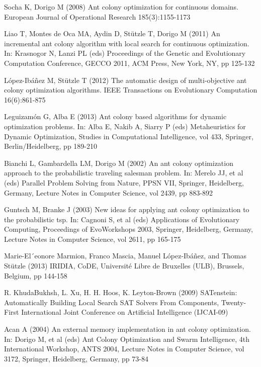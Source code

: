 \documentclass[12pt]{article}
\begin{document}
\begin{thebibliography}{1}
 Socha K, Dorigo M (2008) Ant colony optimization for continuous domains. European Journal of Operational Research 185(3):1155-1173
  
 Liao T, Montes de Oca MA, Aydin D, St{\"u}tzle T, Dorigo M (2011) An incremental ant colony algorithm with local search for continuous optimization. In: Krasnogor N, Lanzi PL (eds) Proceedings of the Genetic and Evolutionary Computation Conference, GECCO 2011, ACM Press, New York, NY, pp 125-132
  
 L{\'o}pez-Ib{\'a}{\~n}ez M, St{\"u}tzle T (2012) The automatic design of multi-objective ant colony optimization algorithms. IEEE Transactions on Evolutionary Computation 16(6):861-875

 Leguizam{\'o}n G, Alba E (2013) Ant colony based algorithms for dynamic optimization problems. In: Alba E, Nakib A, Siarry P (eds) Metaheuristics for Dynamic Optimization, Studies in Computational Intelligence, vol 433, Springer, Berlin/Heidelberg, pp 189-210
 
 Bianchi L, Gambardella LM, Dorigo M (2002) An ant colony optimization approach to the probabilistic traveling salesman problem. In: Merelo JJ, et al (eds) Parallel Problem Solving from Nature, PPSN VII, Springer, Heidelberg, Germany, Lecture Notes in Computer Science, vol 2439, pp 883-892

 Guntsch M, Branke J (2003) New ideas for applying ant colony optimization to the probabilistic tsp. In: Cagnoni S, et al (eds) Applications of Evolutionary Computing, Proceedings of EvoWorkshops 2003, Springer, Heidelberg, Germany, Lecture Notes in Computer Science, vol 2611, pp 165-175

 Marie-El´eonore Marmion, Franco Mascia, Manuel L{\'o}pez-Ib{\'a}{\~n}ez, and Thomas St{\"u}tzle (2013) IRIDIA, CoDE, Universit{\'e} Libre de Bruxelles (ULB), Brussels, Belgium, pp 144-158

 R. KhudaBukhsh, L. Xu, H. H. Hoos, K. Leyton-Brown (2009) SATenstein: Automatically Building Local Search SAT Solvers From Components, Twenty-First International Joint Conference on Artificial Intelligence (IJCAI-09)

 Acan A (2004) An external memory implementation in ant colony optimization. In: Dorigo M, et al (eds) Ant Colony Optimization and Swarm Intelligence, 4th International Workshop, ANTS 2004, Lecture Notes in Computer Science, vol 3172, Springer, Heidelberg, Germany, pp 73-84

\end{thebibliography}

 
\end{document}

